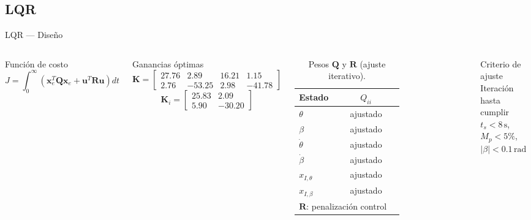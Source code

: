 \documentclass[mathserif,spanish,10pt]{beamer}
\begin{document}
\subsection{LQR}

\begin{frame}{LQR --- Diseño}
\begin{columns}[T]
  \begin{block}{Función de costo}
    \[
      J = \int_0^\infty \!\left(\mathbf{x}_e^T\mathbf{Q}\mathbf{x}_e + \mathbf{u}^T\mathbf{R}\mathbf{u}\right)dt
    \]
  \end{block}

  \vspace{4pt}
  \begin{block}{Ganancias óptimas}
    \centering\scriptsize
    \[
      \mathbf{K} = \begin{bmatrix}
        27.76 & 2.89 & 16.21 & 1.15 \\
        2.76 & -53.25 & 2.98 & -41.78
      \end{bmatrix}
    \]
    \[
      \mathbf{K}_i = \begin{bmatrix}
        25.83 & 2.09 \\
        5.90 & -30.20
      \end{bmatrix}
    \]
  \end{block}

  \begin{table}
    \centering
    \caption{Pesos $\mathbf{Q}$ y $\mathbf{R}$ (ajuste iterativo).}
    \scriptsize
    \begin{tabular}{p{1.6cm}cc}
      \rowcolor{rowhdr}
      \color{white}\textbf{Estado} &
      \color{white}$Q_{ii}$ & \\
      \midrule
      $\theta$         & ajustado \\
      $\beta$          & ajustado \\
      $\dot\theta$     & ajustado \\
      $\dot\beta$      & ajustado \\
      $x_{I,\theta}$   & ajustado \\
      $x_{I,\beta}$    & ajustado \\
      \multicolumn{2}{l}{$\mathbf{R}$: penalización control}\\
    \end{tabular}
  \end{table}

  \begin{alertblock}{Criterio de ajuste}
    \centering\scriptsize
    Iteración hasta cumplir\\
    $t_s<8\,\text{s}$, $M_p<5\%$, $|\beta|<0.1\,\text{rad}$
  \end{alertblock}
\end{columns}
\end{frame}
\end{document}

